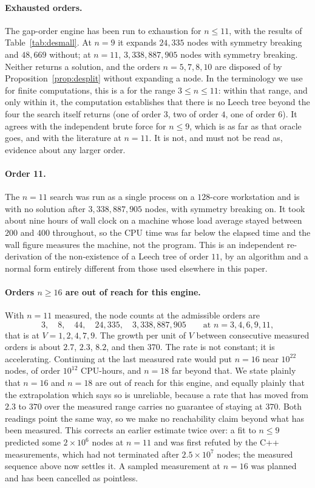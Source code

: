 \paragraph{Exhausted orders.}
The gap-order engine has been run to exhaustion for $n\le11$, with the results
of Table~\ref{tab:desmall}.  At $n=9$ it expands $24{,}335$ nodes with symmetry
breaking and $48{,}669$ without; at $n=11$, $3{,}338{,}887{,}905$ nodes with
symmetry breaking.  Neither returns a solution, and the orders $n=5,7,8,10$ are
disposed of by Proposition~\ref{prop:desplit} without expanding a node.  In the
terminology we use for finite computations, this is a
 for the range $3\le n\le11$: within that
range, and only within it, the computation establishes that there is no Leech
tree beyond the four the search itself returns (one of order $3$, two of order
$4$, one of order $6$).  It agrees with the independent brute force for
$n\le9$, which is as far as that oracle goes, and with the literature at
$n=11$.  It is not, and must not be read as, evidence about any larger order.

\paragraph{Order 11.}
The $n=11$ search was run as a single process on a $128$-core workstation and is
 with no solution after $3{,}338{,}887{,}905$ nodes, with
symmetry breaking on.  It took about nine hours of wall clock on a machine whose
load average stayed between $200$ and $400$ throughout, so the CPU time was far
below the elapsed time and the wall figure measures the machine, not the
program.  This is an independent re-derivation of the non-existence of a Leech
tree of order $11$, by an algorithm and a normal form entirely different from
those used elsewhere in this paper.

\paragraph{Orders $n\ge16$ are out of reach for this engine.}
With $n=11$ measured, the node counts at the admissible orders are
\[
  3,\quad 8,\quad 44,\quad 24{,}335,\quad 3{,}338{,}887{,}905
  \qquad\text{at } n=3,4,6,9,11,
\]
that is at $V=1,2,4,7,9$.  The growth per unit of $V$ between consecutive
measured orders is about $2.7$, $2.3$, $8.2$, and then $370$.  The rate is not
constant; it is accelerating.  Continuing at the last measured rate would put
$n=16$ near $10^{22}$ nodes, of order $10^{12}$ CPU-hours, and $n=18$ far beyond
that.  We state plainly that $n=16$ and $n=18$ are out of reach for this engine,
and equally plainly that the extrapolation which says so is unreliable, because
a rate that has moved from $2.3$ to $370$ over the measured range carries no
guarantee of staying at $370$.  Both readings point the same way, so we make no
reachability claim beyond what has been measured.  This corrects an earlier
estimate twice over: a fit to $n\le9$ predicted some $2\times10^6$ nodes at
$n=11$ and was first refuted by the C++ measurements, which had not terminated
after $2.5\times10^7$ nodes; the measured sequence above now settles it.  A
sampled measurement at $n=16$ was planned and has been cancelled as pointless.

